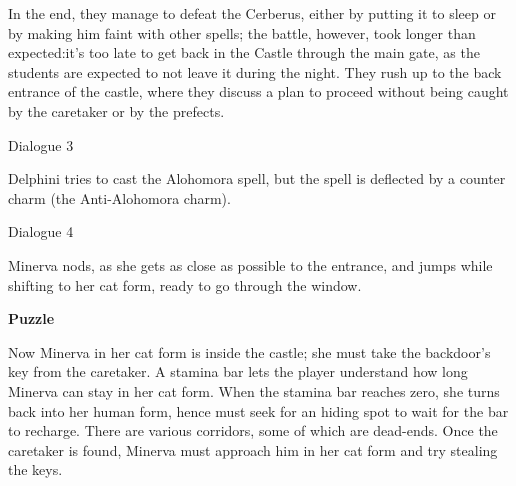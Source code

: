 In the end, they manage to defeat the Cerberus, either by putting it to sleep or by making him faint with other spells; the battle, however, took longer than expected:it's too late to get back in the Castle through the main gate, as the students are expected to not leave it during the night. They rush up to the back entrance of the castle, where they discuss a plan to proceed without being caught by the caretaker or by the prefects. 
 
\begin{dialogue}{Dialogue 3} 
\end{dialogue}

Delphini tries to cast the Alohomora spell, but the spell is deflected by a counter charm (the Anti-Alohomora charm). 


\begin{dialogue}{Dialogue 4} 
\end{dialogue}

Minerva nods, as she gets as close as possible to the entrance, and jumps while shifting to her cat form, ready to go through the window. 

\pagebreak

\textbf{Puzzle}

Now Minerva in her cat form is inside the castle; she must take the backdoor's key from the caretaker. A stamina bar lets the player understand how long Minerva can stay in her cat form. When the stamina bar reaches zero, she turns back into her human form, hence must seek for an hiding spot to wait for the bar to recharge. There are various corridors, some of which are dead-ends. Once the caretaker is found, Minerva must approach him in her cat form and try stealing the keys. 


